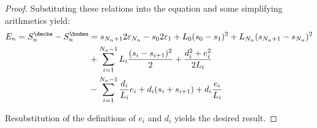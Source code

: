 \begin{thm}
\begin{proof}
Substituting these relations into the equation and some simplifying arithmetics yield:
\begin{align*}
		E_n = S^\decke_n - S^\boden_n 
& =s_{{N_n}+1} 2 \varepsilon_{N_n} - s_0 2 \varepsilon_1 +  L_0 (s_0 - s_1)^2  + L_{N_n} (s_{{N_n}+1} - s_{N_n})^2\\
		&+  \sum_{i=1}^{{N_n}-1} L_i \frac{(s_i - s_{i+1})^2}{2} +  \frac{d_i^2 + e_i^2}{2 L_i} \\
		&-\sum_{i=1}^{{N_n}-1} \frac{d_i}{L_i} e_i  + d_i (s_i + s_{i+1}) + d_i \frac{e_i}{L_i} 
		\\
\end{align*}

Resubstitution of the definitions of $e_i$ and $d_i$ yields the desired result.
\end{proof}
\end{thm}

